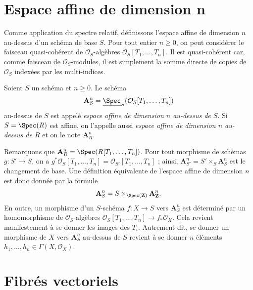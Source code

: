 \section{Espace affine de dimension n}
\label{section-affine-n-space}

\noindent
Comme application du spectre relatif, définissons l'espace affine de
dimension $n$ au-dessus d'un schéma de base $S$. Pour tout entier $n \geq 0$,
on peut considérer le faisceau quasi-cohérent de $\mathcal{O}_S$-algèbres
$\mathcal{O}_S[T_1, \ldots, T_n]$. Il est quasi-cohérent car, comme faisceau
de $\mathcal{O}_S$-modules, il est simplement la somme directe de copies de
$\mathcal{O}_S$ indexées par les multi-indices.

\begin{definition}
\label{definition-affine-n-space}
Soient $S$ un schéma et $n \geq 0$.
Le schéma
$$
\mathbf{A}^n_S =
\underline{\Spec}_S(\mathcal{O}_S[T_1, \ldots, T_n])
$$
au-dessus de $S$ est appelé {\it espace affine de dimension $n$ au-dessus de $S$}.
Si $S = \Spec(R)$ est affine, on l'appelle aussi
{\it espace affine de dimension $n$ au-dessus de $R$} et on le note $\mathbf{A}^n_R$.
\end{definition}

\noindent
Remarquons que $\mathbf{A}^n_R = \Spec(R[T_1, \ldots, T_n])$.
Pour tout morphisme de schémas $g : S' \to S$, on a
$g^*\mathcal{O}_S[T_1, \ldots, T_n] = \mathcal{O}_{S'}[T_1, \ldots, T_n]$ ;
ainsi, $\mathbf{A}^n_{S'} = S' \times_S \mathbf{A}^n_S$ est le changement
de base. Une définition équivalente de l'espace affine de dimension $n$
est donc donnée par la formule
$$
\mathbf{A}^n_S = S \times_{\Spec(\mathbf{Z})} \mathbf{A}^n_{\mathbf{Z}}.
$$
En outre, un morphisme d'un $S$-schéma $f : X \to S$
vers $\mathbf{A}^n_S$ est déterminé par un homomorphisme de
$\mathcal{O}_S$-algèbres
$\mathcal{O}_S[T_1, \ldots, T_n] \to f_*\mathcal{O}_X$.
Cela revient manifestement à se donner les images des $T_i$.
Autrement dit, se donner un morphisme de $X$ vers $\mathbf{A}^n_S$ au-dessus de $S$
revient à se donner $n$ éléments
$h_1, \ldots, h_n \in \Gamma(X, \mathcal{O}_X)$.
















\section{Fibrés vectoriels}
\label{section-vector-bundle}

